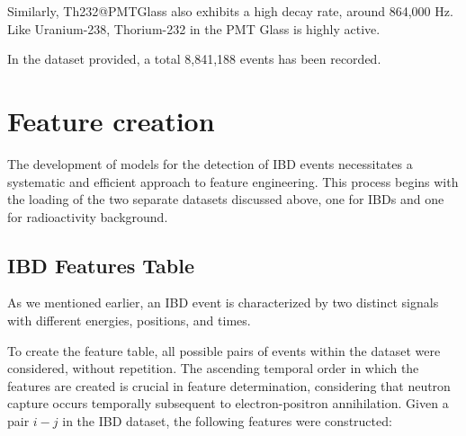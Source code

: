 Similarly, Th232@PMTGlass also exhibits a high decay rate, around 864,000 Hz. Like Uranium-238, Thorium-232 in the PMT Glass is highly active. 


In the dataset provided, a total 8,841,188 events has been recorded.

\newpage

\section{Feature creation}

The development of models for the detection of IBD events necessitates a systematic and efficient approach to feature engineering. This process begins with the loading of the two separate datasets discussed above, one for IBDs and one for radioactivity background.

\subsection{IBD Features Table}
As we mentioned earlier, an IBD event is characterized by two distinct signals with different energies, positions, and times. 

To create the feature table, all possible pairs of events within the dataset were considered, without repetition. The ascending temporal order in which the features are created is crucial in feature determination, considering that neutron capture occurs temporally subsequent to electron-positron annihilation. 
Given a pair $i-j$ in the IBD dataset, the following features were constructed:


